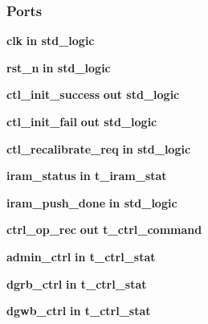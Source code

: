 \subsubsection*{Ports}
 \begin{DoxyCompactItemize}
\item 
{\bf clk}  {\bfseries {\bfseries \textcolor{keywordflow}{in}\textcolor{vhdlchar}{ }}} {\bfseries \textcolor{comment}{std\+\_\+logic}\textcolor{vhdlchar}{ }} 
\item 
{\bf rst\+\_\+n}  {\bfseries {\bfseries \textcolor{keywordflow}{in}\textcolor{vhdlchar}{ }}} {\bfseries \textcolor{comment}{std\+\_\+logic}\textcolor{vhdlchar}{ }} 
\item 
{\bf ctl\+\_\+init\+\_\+success}  {\bfseries {\bfseries \textcolor{keywordflow}{out}\textcolor{vhdlchar}{ }}} {\bfseries \textcolor{comment}{std\+\_\+logic}\textcolor{vhdlchar}{ }} 
\item 
{\bf ctl\+\_\+init\+\_\+fail}  {\bfseries {\bfseries \textcolor{keywordflow}{out}\textcolor{vhdlchar}{ }}} {\bfseries \textcolor{comment}{std\+\_\+logic}\textcolor{vhdlchar}{ }} 
\item 
{\bf ctl\+\_\+recalibrate\+\_\+req}  {\bfseries {\bfseries \textcolor{keywordflow}{in}\textcolor{vhdlchar}{ }}} {\bfseries \textcolor{comment}{std\+\_\+logic}\textcolor{vhdlchar}{ }} 
\item 
{\bf iram\+\_\+status}  {\bfseries {\bfseries \textcolor{keywordflow}{in}\textcolor{vhdlchar}{ }}} {\bfseries {\bfseries {\bf t\+\_\+iram\+\_\+stat}} \textcolor{vhdlchar}{ }} 
\item 
{\bf iram\+\_\+push\+\_\+done}  {\bfseries {\bfseries \textcolor{keywordflow}{in}\textcolor{vhdlchar}{ }}} {\bfseries \textcolor{comment}{std\+\_\+logic}\textcolor{vhdlchar}{ }} 
\item 
{\bf ctrl\+\_\+op\+\_\+rec}  {\bfseries {\bfseries \textcolor{keywordflow}{out}\textcolor{vhdlchar}{ }}} {\bfseries {\bfseries {\bf t\+\_\+ctrl\+\_\+command}} \textcolor{vhdlchar}{ }} 
\item 
{\bf admin\+\_\+ctrl}  {\bfseries {\bfseries \textcolor{keywordflow}{in}\textcolor{vhdlchar}{ }}} {\bfseries {\bfseries {\bf t\+\_\+ctrl\+\_\+stat}} \textcolor{vhdlchar}{ }} 
\item 
{\bf dgrb\+\_\+ctrl}  {\bfseries {\bfseries \textcolor{keywordflow}{in}\textcolor{vhdlchar}{ }}} {\bfseries {\bfseries {\bf t\+\_\+ctrl\+\_\+stat}} \textcolor{vhdlchar}{ }} 
\item 
{\bf dgwb\+\_\+ctrl}  {\bfseries {\bfseries \textcolor{keywordflow}{in}\textcolor{vhdlchar}{ }}} {\bfseries {\bfseries {\bf t\+\_\+ctrl\+\_\+stat}} \textcolor{vhdlchar}{ }} 

\end{DoxyCompactItemize}
